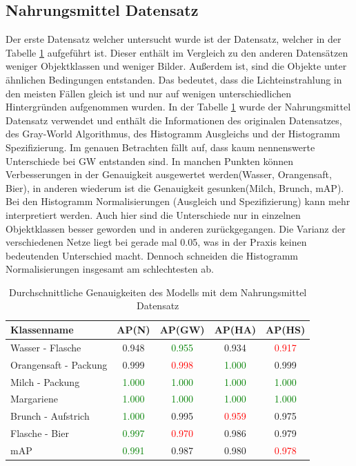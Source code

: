 \documentclass[a4paper,12pt,oneside]{article}
\begin{document}
  \subsection{Nahrungsmittel Datensatz}
Der erste Datensatz welcher untersucht wurde ist der Datensatz, welcher in der Tabelle \ref{tab:nahrungsmitteltest} aufgeführt ist. Dieser enthält im Vergleich zu den anderen Datensätzen weniger Objektklassen und weniger Bilder. Außerdem ist, sind die Objekte unter ähnlichen Bedingungen entstanden. Das bedeutet, dass die Lichteinstrahlung in den meisten Fällen gleich ist und nur auf wenigen unterschiedlichen Hintergründen aufgenommen wurden. In der Tabelle \ref{tab:nahrungsmitteltest} wurde der Nahrungsmittel Datensatz verwendet und enthält die Informationen des originalen Datensatzes, des Gray-World Algorithmus, des Histogramm Ausgleichs und der Histogramm Spezifizierung. Im genauen Betrachten fällt auf, dass kaum nennenswerte Unterschiede bei GW entstanden sind. In manchen Punkten können Verbesserungen in der Genauigkeit ausgewertet werden(Wasser, Orangensaft, Bier), in anderen wiederum ist die Genauigkeit gesunken(Milch, Brunch, mAP).\\
Bei den Histogramm Normalisierungen (Ausgleich und Spezifizierung) kann mehr interpretiert werden. Auch hier sind die Unterschiede nur in einzelnen Objektklassen besser geworden und in anderen zurückgegangen. Die Varianz der verschiedenen Netze liegt bei gerade mal 0.05, was in der Praxis keinen bedeutenden Unterschied macht. Dennoch schneiden die Histogramm Normalisierungen insgesamt am schlechtesten ab.
\begin{table}
[h]
\caption{Durchschnittliche Genauigkeiten des Modells mit dem Nahrungsmittel Datensatz}
\centering
\begin{tabular}{|l|c|c|c|c|}
\hline
Klassenname & AP(N) & AP(GW) & AP(HA) & AP(HS)\\
\hline
Wasser - Flasche & 0.948 & \textcolor{green}{0.955} & 0.934 & \textcolor{red}{0.917}\\
Orangensaft - Packung & 0.999 & \textcolor{red}{0.998} & \textcolor{green}{1.000} & 0.999\\
Milch - Packung & \textcolor{green}{1.000} & \textcolor{green}{1.000} & \textcolor{green}{1.000} & \textcolor{green}{1.000}\\
Margariene & \textcolor{green}{1.000} & \textcolor{green}{1.000} & \textcolor{green}{1.000} & \textcolor{green}{1.000}\\
Brunch - Aufstrich & \textcolor{green}{1.000} & 0.995 & \textcolor{red}{0.959} & 0.975\\
Flasche - Bier & \textcolor{green}{0.997} & \textcolor{red}{0.970} & 0.986 & 0.979\\
\hline
mAP & \textcolor{green}{0.991} & 0.987 & 0.980 & \textcolor{red}{0.978}\\
\hline
\end{tabular}
\label{tab:nahrungsmitteltest}
\end{table}
\end{document}
